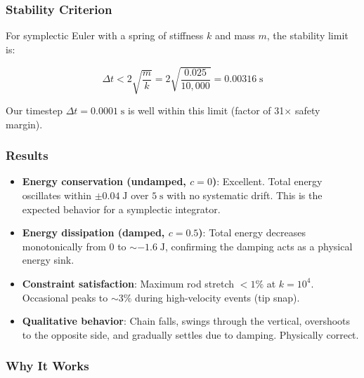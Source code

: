 \documentclass[11pt,a4paper]{article}
\begin{document}
\subsubsection{Stability Criterion}

For symplectic Euler with a spring of stiffness $k$ and mass $m$, the
stability limit is:

\begin{equation}
    \Delta t < 2\sqrt{\frac{m}{k}}
    = 2\sqrt{\frac{0.025}{10{,}000}}
    = 0.00316\;\text{s}
\end{equation}

Our timestep $\Delta t = 0.0001\;\text{s}$ is well within this limit
(factor of 31$\times$ safety margin).

\subsubsection{Results}

\begin{itemize}
    \item \textbf{Energy conservation (undamped, $c=0$)}: Excellent.
          Total energy oscillates within $\pm 0.04\;\text{J}$ over
          $5\;\text{s}$ with no systematic drift. This is the expected
          behavior for a symplectic integrator.
    \item \textbf{Energy dissipation (damped, $c=0.5$)}: Total energy
          decreases monotonically from $0$ to $\sim -1.6\;\text{J}$,
          confirming the damping acts as a physical energy sink.
    \item \textbf{Constraint satisfaction}: Maximum rod stretch $<1\%$ at
          $k = 10^4$. Occasional peaks to $\sim 3\%$ during high-velocity
          events (tip snap).
    \item \textbf{Qualitative behavior}: Chain falls, swings through the
          vertical, overshoots to the opposite side, and gradually settles
          due to damping. Physically correct.
\end{itemize}

\subsubsection{Why It Works}
\end{document}
